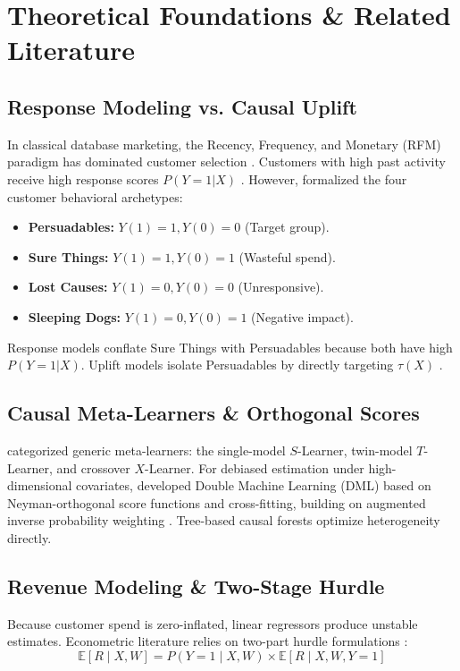 \documentclass[11pt,a4paper]{article}
\begin{document}
\section{Theoretical Foundations \& Related Literature}

\subsection{Response Modeling vs. Causal Uplift}
In classical database marketing, the Recency, Frequency, and Monetary (RFM) paradigm has dominated customer selection \citep{bult1995optimal, fader2005rfm}. Customers with high past activity receive high response scores $P(Y=1|X)$ \citep{hughes1994strategic, verhoef2003commercial}. However, \citet{radcliffe2011real} formalized the four customer behavioral archetypes:
\begin{itemize}
    \item \textbf{Persuadables:} $Y(1) = 1, Y(0) = 0$ (Target group).
    \item \textbf{Sure Things:} $Y(1) = 1, Y(0) = 1$ (Wasteful spend).
    \item \textbf{Lost Causes:} $Y(1) = 0, Y(0) = 0$ (Unresponsive).
    \item \textbf{Sleeping Dogs:} $Y(1) = 0, Y(0) = 1$ (Negative impact).
\end{itemize}
Response models conflate Sure Things with Persuadables because both have high $P(Y=1|X)$. Uplift models isolate Persuadables by directly targeting $\tau(X)$ \citep{kane2014mining}.

\subsection{Causal Meta-Learners \& Orthogonal Scores}
\citet{kunzel2019metalearners} categorized generic meta-learners: the single-model $S$-Learner, twin-model $T$-Learner, and crossover $X$-Learner. For debiased estimation under high-dimensional covariates, \citet{chernozhukov2018double} developed Double Machine Learning (DML) based on Neyman-orthogonal score functions and cross-fitting, building on augmented inverse probability weighting \citep{robins1994estimation}. Tree-based causal forests \citep{athey2016recursive, wager2018estimation} optimize heterogeneity directly.

\subsection{Revenue Modeling \& Two-Stage Hurdle}
Because customer spend is zero-inflated, linear regressors produce unstable estimates. Econometric literature relies on two-part hurdle formulations \citep{cragg1971some, duan1983comparison, gubela2019conversion}:
\begin{equation}
\mathbb{E}[R \mid X, W] = P(Y=1 \mid X, W) \times \mathbb{E}[R \mid X, W, Y=1]
\end{equation}
\end{document}
